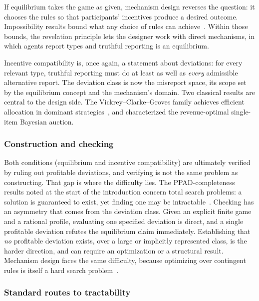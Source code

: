 If equilibrium takes the game as given, mechanism design reverses the
question: it chooses the rules so that participants' incentives produce a desired
outcome. Impossibility results bound what any choice of rules can
achieve~\citep{Arrow1951,Gibbard1973,Satterthwaite1975}. Within those bounds, the
revelation principle lets the designer work with direct mechanisms, in which
agents report types and truthful reporting is an equilibrium.

Incentive compatibility is, once again, a statement about deviations: for every
relevant type, truthful reporting must do at least as well as \emph{every}
admissible alternative report. The deviation class is now the misreport space,
its scope set by the equilibrium concept and the mechanism's domain. Two classical results are central to the design side. The Vickrey--Clarke--Groves family
achieves efficient allocation in dominant
strategies~\citep{Vickrey1961,Clarke1971,Groves1973}, and \citet{Myerson1981}
characterized the revenue-optimal single-item Bayesian auction.

\subsubsection{Construction and checking}

Both conditions (equilibrium and incentive compatibility) are ultimately
verified by ruling out profitable deviations, and verifying is not the same
problem as constructing. That gap is where the difficulty lies. The PPAD-completeness results noted at
the start of the introduction concern total search problems: a solution is
guaranteed to exist, yet finding one may be
intractable~\citep{Papadimitriou1994}. Checking has an asymmetry that comes from the
deviation class. Given an explicit finite game and a rational profile, evaluating
one specified deviation is direct, and a single profitable deviation refutes the
equilibrium claim immediately. Establishing that \emph{no} profitable deviation
exists, over a large or implicitly represented class, is the harder direction, and
can require an optimization or a structural result. Mechanism design faces the
same difficulty, because optimizing over contingent rules is
itself a hard search problem~\citep{ConitzerSandholm2002}.

\subsubsection{Standard routes to tractability}

